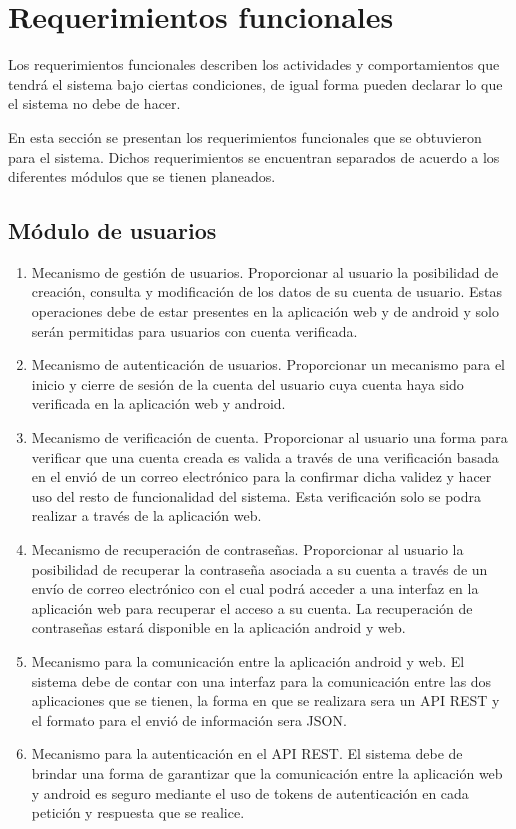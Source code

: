 \section{Requerimientos funcionales}
    Los requerimientos funcionales describen los actividades y comportamientos que tendrá el sistema bajo ciertas condiciones, de igual forma pueden declarar lo que el sistema no debe de hacer.
    
    En esta sección se presentan los requerimientos funcionales que se obtuvieron para el sistema. Dichos requerimientos se encuentran separados de acuerdo a los diferentes módulos que se tienen planeados.
    \subsection{Módulo de usuarios}
    \begin{enumerate}[label=RF\arabic*.]
    \item Mecanismo de gestión de usuarios. Proporcionar al usuario la posibilidad de creación, consulta y modificación de los datos de su cuenta de usuario. Estas operaciones debe de estar presentes en la aplicación web y de android y solo serán permitidas para usuarios con cuenta verificada.
    \item Mecanismo de autenticación de usuarios. Proporcionar un mecanismo para el inicio y cierre de sesión de la cuenta del usuario cuya cuenta haya sido verificada en la aplicación web y android.
    \item Mecanismo de verificación de cuenta. Proporcionar al usuario una forma para verificar que una cuenta creada es valida a través de una verificación basada en el envió de un correo electrónico para la confirmar dicha validez y hacer uso del resto de funcionalidad del sistema. Esta verificación solo se podra realizar a través de la aplicación web.
    \item Mecanismo de recuperación de contraseñas. Proporcionar al usuario la posibilidad de recuperar la contraseña asociada a su cuenta a través de un envío de correo electrónico con el cual podrá acceder a una interfaz en la aplicación web para recuperar el acceso a su cuenta. La recuperación de contraseñas estará disponible en la aplicación android y web.
    \item Mecanismo para la comunicación entre la aplicación android y web. El sistema debe de contar con una interfaz para la comunicación entre las dos aplicaciones que se tienen, la forma en que se realizara sera un API REST y el formato para el envió de información sera JSON.
    \item Mecanismo para la autenticación en el API REST. El sistema debe de brindar una forma de garantizar que la comunicación entre la aplicación web y android es seguro mediante el uso de tokens de autenticación en cada petición y respuesta que se realice.
    \end{enumerate}
    
